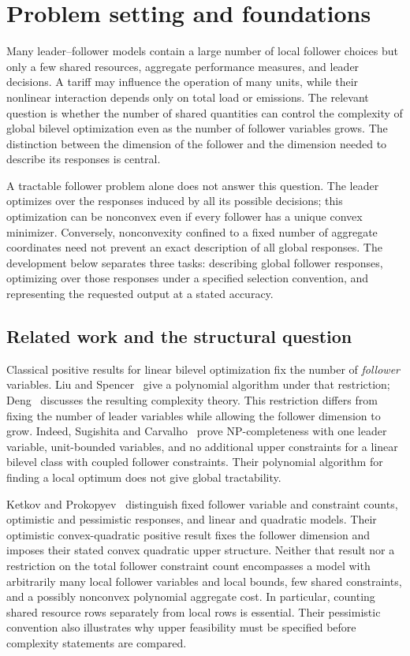 \section{Problem setting and foundations}\label{sec:foundations}

Many leader--follower models contain a large number of local follower
choices but only a few shared resources, aggregate performance measures,
and leader decisions. A tariff may influence the operation of many units,
while their nonlinear interaction depends only on total load or emissions.
The relevant question is whether the number of shared quantities can
control the complexity of global bilevel optimization even as the number
of follower variables grows. The distinction between the dimension of the
follower and the dimension needed to describe its responses is central.

A tractable follower problem alone does not answer this question. The
leader optimizes over the responses induced by all its possible decisions;
this optimization can be nonconvex even if every follower has a unique
convex minimizer. Conversely, nonconvexity confined to a fixed number of
aggregate coordinates need not prevent an exact description of all global
responses. The development below separates three tasks: describing global
follower responses, optimizing over those responses under a specified
selection convention, and representing the requested output at a stated
accuracy.

\subsection{Related work and the structural question}\label{subsec:related}

Classical positive results for linear bilevel optimization fix the number
of \emph{follower} variables. Liu and Spencer~\cite{LiuSpencer1995} give a
polynomial algorithm under that restriction; Deng~\cite{Deng1998}
discusses the resulting complexity theory. This restriction differs from
fixing the number of leader variables while allowing the follower dimension
to grow. Indeed, Sugishita and Carvalho~\cite{SugishitaCarvalho2026} prove
NP-completeness with one leader variable, unit-bounded variables, and no
additional upper constraints for a linear bilevel class with coupled
follower constraints. Their polynomial algorithm for finding a local
optimum does not give global tractability.

Ketkov and Prokopyev~\cite{KetkovProkopyev2026} distinguish fixed follower
variable and constraint counts, optimistic and pessimistic responses, and
linear and quadratic models. Their optimistic convex-quadratic positive
result fixes the follower dimension and imposes their stated convex
quadratic upper structure. Neither that result nor a restriction on the
total follower constraint count encompasses a model with arbitrarily many
local follower variables and local bounds, few shared constraints, and a
possibly nonconvex polynomial aggregate cost. In particular, counting
shared resource rows separately from local rows is essential. Their
pessimistic convention also illustrates why upper feasibility must be
specified before complexity statements are compared.

